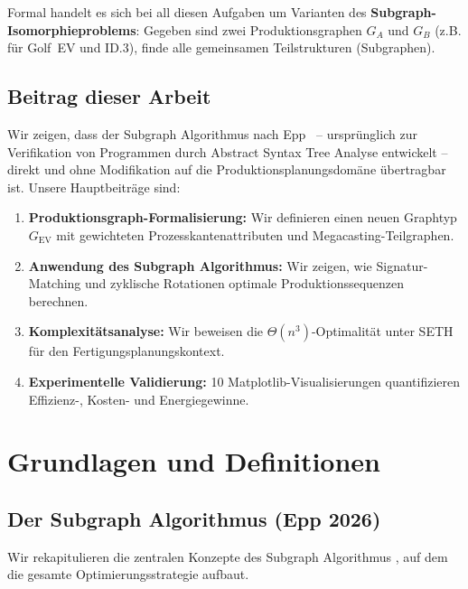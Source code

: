 ﻿\documentclass[a4paper,12pt]{article}
\theoremstyle{definition}
\begin{document}
Formal handelt es sich bei all diesen Aufgaben um Varianten des \textbf{Subgraph-Isomorphieproblems}:
Gegeben sind zwei Produktionsgraphen $G_A$ und $G_B$ (z.B. für Golf~EV und ID.3), finde alle
gemeinsamen Teilstrukturen (Subgraphen).

\subsection{Beitrag dieser Arbeit}

Wir zeigen, dass der Subgraph Algorithmus nach Epp~\cite{epp2026} -- ursprünglich zur
Verifikation von Programmen durch Abstract Syntax Tree Analyse entwickelt -- direkt und
ohne Modifikation auf die Produktionsplanungsdomäne übertragbar ist. Unsere Hauptbeiträge sind:

\begin{enumerate}
\item \textbf{Produktionsgraph-Formalisierung:} Wir definieren einen neuen Graphtyp
  $G_{\mathrm{EV}}$ mit gewichteten Prozesskantenattributen und Megacasting-Teilgraphen.
\item \textbf{Anwendung des Subgraph Algorithmus:} Wir zeigen, wie Signatur-Matching und
  zyklische Rotationen optimale Produktionssequenzen berechnen.
\item \textbf{Komplexitätsanalyse:} Wir beweisen die $\Theta(n^3)$-Optimalität unter SETH
  für den Fertigungsplanungskontext.
\item \textbf{Experimentelle Validierung:} 10 Matplotlib-Visualisierungen quantifizieren
  Effizienz-, Kosten- und Energiegewinne.
\end{enumerate}

\section{Grundlagen und Definitionen}

\subsection{Der Subgraph Algorithmus (Epp 2026)}

Wir rekapitulieren die zentralen Konzepte des Subgraph Algorithmus \cite{epp2026}, auf dem
die gesamte Optimierungsstrategie aufbaut.
\end{document}
